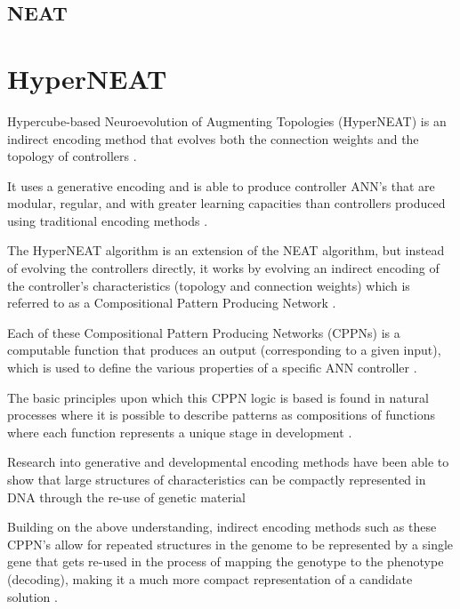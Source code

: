 \subsection{NEAT}




\section{HyperNEAT}

Hypercube-based Neuroevolution of Augmenting Topologies (HyperNEAT) is an indirect encoding method that evolves both the connection weights and the topology of controllers \cite{stanley2009hypercube}.

It uses a generative encoding and is able to produce controller ANN's that are modular, regular, and with greater learning capacities than controllers produced using traditional encoding methods \cite{tonelli2013relationships}.

The HyperNEAT algorithm is an extension of the NEAT algorithm, but instead of evolving the controllers directly, it works by evolving an indirect encoding of the controller's characteristics (topology and connection weights) which is referred to as a Compositional Pattern Producing Network \cite{stanley2009hypercube}.

Each of these Compositional Pattern Producing Networks (CPPNs) is a computable function that produces an output (corresponding to a given input), which is used to define the various properties of a specific ANN controller \cite{clune2009evolving, hausknecht2012hyperneat}.

The basic principles upon which this CPPN logic is based is found in natural processes where it is possible to describe patterns as compositions of functions where each function represents a unique stage in development \cite{DAmbrosioStanley2008}.

Research into generative and developmental encoding methods have been able to show that large structures of characteristics can be compactly represented in DNA through the re-use of genetic material 

Building on the above understanding, indirect encoding methods such as these CPPN's allow for repeated structures in the genome to be represented by a single gene that gets re-used in the process of mapping the genotype to the phenotype (decoding), making it a much more compact representation of a candidate solution \cite{stanley2009hypercube}.

